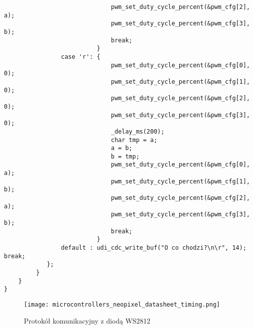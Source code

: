 \documentclass[a4paper]{article}
\begin{document}
\begin{lstlisting}
                              pwm_set_duty_cycle_percent(&pwm_cfg[2], a);
                              pwm_set_duty_cycle_percent(&pwm_cfg[3], b);
                              break;
                          }
                case 'r': {
                              pwm_set_duty_cycle_percent(&pwm_cfg[0], 0);
                              pwm_set_duty_cycle_percent(&pwm_cfg[1], 0);
                              pwm_set_duty_cycle_percent(&pwm_cfg[2], 0);
                              pwm_set_duty_cycle_percent(&pwm_cfg[3], 0);
                              _delay_ms(200);
                              char tmp = a;
                              a = b;
                              b = tmp;
                              pwm_set_duty_cycle_percent(&pwm_cfg[0], a);
                              pwm_set_duty_cycle_percent(&pwm_cfg[1], b);
                              pwm_set_duty_cycle_percent(&pwm_cfg[2], a);
                              pwm_set_duty_cycle_percent(&pwm_cfg[3], b);
                              break;
                          }
                default : udi_cdc_write_buf("O co chodzi?\n\r", 14); break;
            };
         }
    }
}
\end{lstlisting}
\begin{figure}
    \centering
    \texttt{[image: microcontrollers\_neopixel\_datasheet\_timing.png]}
    \caption{Protokół komunikacyjny z diodą WS2812}
\end{figure}
\end{document}
